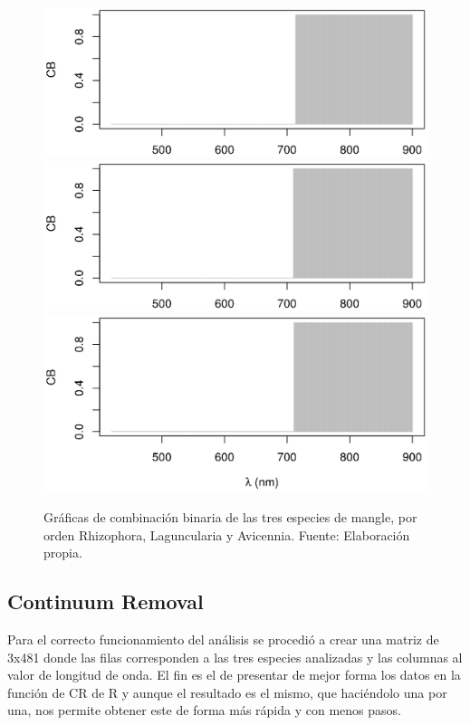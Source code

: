 \begin{figure}
	\centering
	\includegraphics[width=0.8\linewidth]{./Imagenes/IAE_RM.eps}
	\includegraphics[width=0.8\linewidth]{./Imagenes/IAE_LR.eps}
	\includegraphics[width=0.8\linewidth]{./Imagenes/IAE_AG.eps}
	\caption[Gráficas de combinación binaria]{Gráficas de combinación binaria de las tres especies de mangle, por orden Rhizophora, Laguncularia y Avicennia. Fuente: Elaboración propia.}
	\label{fig:CB}
\end{figure}

\subsection{Continuum Removal}

Para el correcto funcionamiento del análisis se procedió a crear una matriz de 3x481 donde las filas corresponden a las tres especies analizadas y las columnas al valor de longitud de onda. El fin es el de presentar de mejor forma los datos en la función de \ac{CR} de R y aunque el resultado es el mismo, que haciéndolo una por una, nos permite obtener este de forma más rápida y con menos pasos.\Sep

